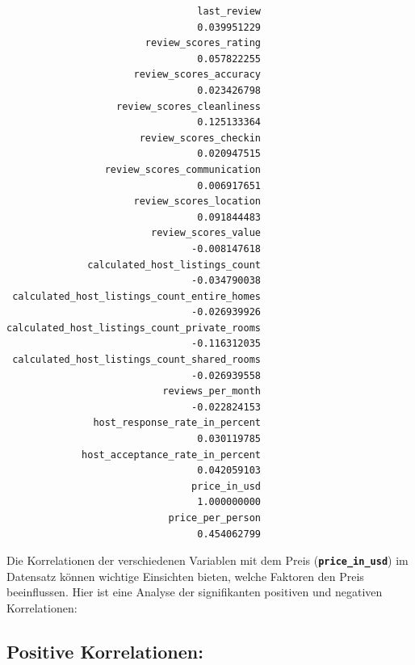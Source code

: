\documentclass[
  journal,
]{IEEEtran}%
\begin{document}
\begin{verbatim}
                                 last_review 
                                 0.039951229 
                        review_scores_rating 
                                 0.057822255 
                      review_scores_accuracy 
                                 0.023426798 
                   review_scores_cleanliness 
                                 0.125133364 
                       review_scores_checkin 
                                 0.020947515 
                 review_scores_communication 
                                 0.006917651 
                      review_scores_location 
                                 0.091844483 
                         review_scores_value 
                                -0.008147618 
              calculated_host_listings_count 
                                -0.034790038 
 calculated_host_listings_count_entire_homes 
                                -0.026939926 
calculated_host_listings_count_private_rooms 
                                -0.116312035 
 calculated_host_listings_count_shared_rooms 
                                -0.026939558 
                           reviews_per_month 
                                -0.022824153 
               host_response_rate_in_percent 
                                 0.030119785 
             host_acceptance_rate_in_percent 
                                 0.042059103 
                                price_in_usd 
                                 1.000000000 
                            price_per_person 
                                 0.454062799 
\end{verbatim}

Die Korrelationen der verschiedenen Variablen mit dem Preis
(\textbf{\texttt{price\_in\_usd}}) im Datensatz können wichtige
Einsichten bieten, welche Faktoren den Preis beeinflussen. Hier ist eine
Analyse der signifikanten positiven und negativen Korrelationen:

\hypertarget{positive-korrelationen}{%
\subsection{\texorpdfstring{\textbf{Positive
Korrelationen:}}{Positive Korrelationen:}}\label{positive-korrelationen}}
\end{document}
